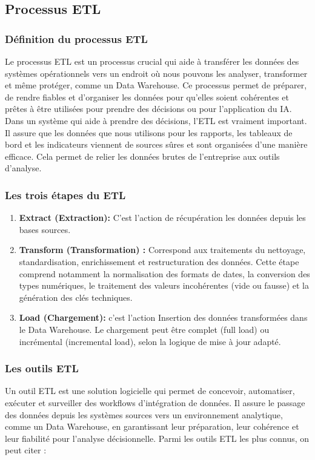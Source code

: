 \subsection{Processus ETL}
\subsubsection{Définition du processus ETL}
Le processus ETL est un processus crucial qui aide à transférer les données des systèmes opérationnels vers un endroit où nous pouvons les analyser, transformer et même protéger, comme un Data Warehouse. Ce processus permet de préparer, de rendre fiables et d'organiser les données pour qu'elles soient cohérentes et prêtes à être utilisées pour prendre des décisions ou pour l’application du IA.
Dans un système qui aide à prendre des décisions, l'ETL est vraiment important. Il assure que les données que nous utilisons pour les rapports, les tableaux de bord et les indicateurs viennent de sources sûres et sont organisées d’une manière efficace. Cela permet de relier les données brutes de l'entreprise aux outils d'analyse.


\subsubsection{Les trois étapes du ETL}
\begin{enumerate}
    \item \textbf{Extract (Extraction):} C’est l’action de récupération les données depuis les bases sources.
    \item \textbf{Transform (Transformation) :} Correspond aux traitements du nettoyage, standardisation, enrichissement et restructuration des données. Cette étape comprend notamment la normalisation des formats de dates, la conversion des types numériques, le traitement des valeurs incohérentes (vide ou fausse) et la génération des clés techniques.
    \item \textbf{Load (Chargement):} c’est l’action Insertion des données transformées dans le Data Warehouse. Le chargement peut être complet (full load) ou incrémental (incremental load), selon la logique de mise à jour adapté.
\end{enumerate}

\subsubsection{Les outils ETL}
Un outil ETL est une solution logicielle qui permet de concevoir, automatiser, exécuter et surveiller des workflows d’intégration de données. Il assure le passage des données depuis les systèmes sources vers un environnement analytique, comme un Data Warehouse, en garantissant leur préparation, leur cohérence et leur fiabilité pour l’analyse décisionnelle.
Parmi les outils ETL les plus connus, on peut citer :

